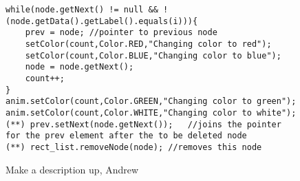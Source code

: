 \begin{figure}
\begin{center}
\begin{verbatim}
while(node.getNext() != null && !(node.getData().getLabel().equals(i))){
    prev = node; //pointer to previous node
    setColor(count,Color.RED,"Changing color to red");
    setColor(count,Color.BLUE,"Changing color to blue");
    node = node.getNext();
    count++;
}
anim.setColor(count,Color.GREEN,"Changing color to green");
anim.setColor(count,Color.WHITE,"Changing color to white");
(**) prev.setNext(node.getNext());   //joins the pointer for the prev element after the to be deleted node
(**) rect_list.removeNode(node); //removes this node
\end{verbatim}
\end{center}
\caption{Make a description up, Andrew}
\label{fig:linkedListsExample}
\end{figure}